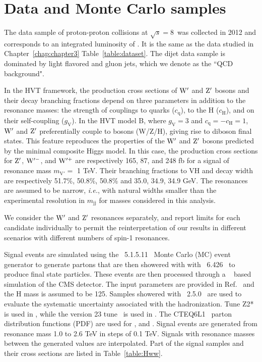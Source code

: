 \newpage

\section{Data and Monte Carlo samples}
\label{sec:data_and_mc_samples}


The data sample of proton-proton collisions at $\sqrt{s}=8$~\TeVcc was collected in 2012 and corresponds to
an integrated luminosity of \intlumi. It is the same as the data studied in 
Chapter~\ref{chap:chapter3} Table~\ref{table:dataset}. 
The dijet data sample is dominated by light flavored and gluon jets, which we denote as 
the ``QCD background".  

In the HVT framework, the production cross sections of 
${\rm W'}$ and ${\rm Z'}$ bosons and their decay branching fractions depend on 
three parameters in addition to the resonance masses:  the 
strength of couplings to quarks ($c_\mathrm{q}$), to the H ($c_\mathrm{H}$),  and on
their self-coupling ($g_\mathrm{V}$).
In the HVT model B, 
where $g_\mathrm{V}=3$ and $c_\mathrm{q}=-c_\mathrm{H}=1$, 
 ${\rm W'}$ and ${\rm Z'}$ preferentially couple to bosons (W/Z/H),
giving rise to diboson final states.
This feature reproduces the properties of the ${\rm W'}$ and ${\rm Z'}$ bosons
 predicted by the minimal composite Higgs model.
In this case, the production cross sections for ${\rm Z'}$,
${\rm W'^{-}}$, and ${\rm W'^{+}}$ are respectively 165, 
87, and 248 fb
for a signal of resonance mass $m_\mathrm{V'} =$ 1 TeV.
Their branching
fractions to VH and decay width are respectively   
51.7\%, 50.8\%, 50.8\% and 35.0, 34.9, 34.9 GeV. 
The resonances are assumed to be narrow, {\it i.e.}, with natural
widths smaller than the experimental resolution in $m_\mathrm{jj}$ for
masses considered in this analysis.

We consider the ${\rm W'}$ and ${\rm Z'}$ 
resonances separately, and report limits for 
each candidate individually to permit 
the reinterpretation of our results in 
different scenarios with different numbers of spin-1 resonances.

Signal events are simulated using 
the \MADGRAPH~5.1.5.11~\cite{madgraph} Monte Carlo (MC) event 
generator to generate partons that are 
then showered with with \PYTHIA~6.426~\cite{Sjostrand:2006za} to 
produce final state particles. These events are then 
processed through a \GEANTfour~\cite{refGEANT} based simulation of 
the CMS detector. The \MADGRAPH input parameters are 
provided in Ref.~\cite{Pappadopulo:2014qza1} and the H mass 
is assumed to be 125\GeVcc. Samples showered 
with \HERWIG{++}~2.5.0~\cite{herwig} are 
used to evaluate the systematic uncertainty 
associated with the hadronization. Tune Z2*~\cite{bib_tunez1} is 
used in \PYTHIA, while the version 23 tune~\cite{herwig} is 
used in \HERWIG{++}. The CTEQ6L1~\cite{cteq} parton distribution 
functions (PDF) are used for \MADGRAPH, \PYTHIA and \HERWIG{++}. 
Signal events are generated from resonance mass 1.0 to 2.6 TeV in 
steps of 0.1 TeV. Signals with resonance masses 
between the generated values are interpolated.
Part of the signal samples and their cross sections are listed in Table~\ref{table:Hww}.


